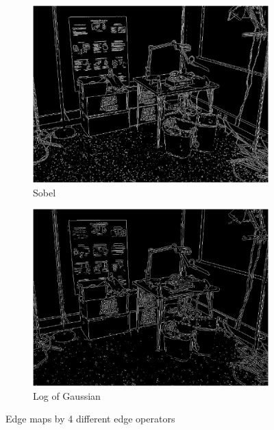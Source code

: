 \documentclass[lettersize,journal]{IEEEtran}
\begin{document}
\begin{figure}[h]
\begin{subfigure}[h]{0.21\textwidth}
        \centering
        \includegraphics[width=\linewidth]{edge_map_sobel_0.025}
        \caption{Sobel}  
    \end{subfigure}
    \begin{subfigure}[h]{0.21\textwidth}
        \centering
        \includegraphics[width=\linewidth]{edge_map_log}
        \caption{Log of Gaussian}  
    \end{subfigure}
    \caption{Edge maps by 4 different edge operators}
    \label{fig:7}
\end{figure}
\end{document}
